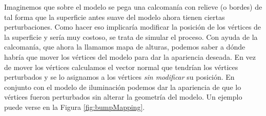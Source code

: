 Imaginemos que sobre el modelo se pega una calcomanía con relieve (o bordes) de tal forma que la superficie antes suave del modelo ahora tienen ciertas perturbaciones. Como hacer eso implicaría modificar la posición de los vértices de la superficie y sería muy costoso, se trata de simular el proceso. Con ayuda de la calcomanía, que ahora la llamamos mapa de alturas, podemos saber a dónde habría que mover los vértices del modelo para dar la apariencia deseada. En vez de mover los vértices calculamos el vector normal que tendrían los vértices perturbados y se lo asignamos a los vértices \emph{sin modificar} su posición. En conjunto con el modelo de iluminación podemos dar la apariencia de que lo vértices fueron perturbados sin alterar la geometría del modelo. Un ejemplo puede verse en la Figura \ref{fig:bumpMapping}.

